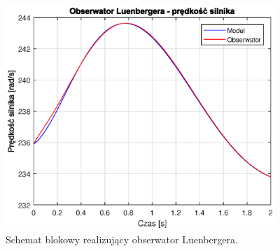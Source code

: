 \documentclass[11pt,a4paper]{article}
\begin{document}
\begin{figure}[ht]
	\centering
	\includegraphics[width=4in]{Figures/obsv_w_v.eps}
	\caption{Schemat blokowy realizujący obserwator Luenbergera.}
	\label{fig:obsv_w_v}
\end{figure}
\end{document}

